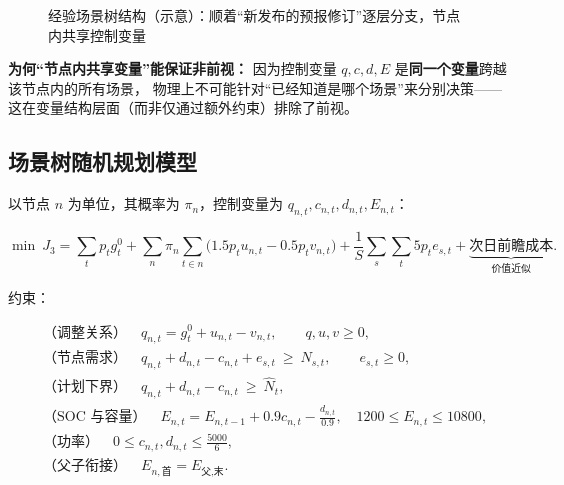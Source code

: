 \begin{figure}[H]
\centering
{}
\caption{经验场景树结构（示意）：顺着“新发布的预报修订”逐层分支，节点内共享控制变量}
\label{fig:q3-tree}
\end{figure}

\vspace{0.2em}
\noindent\textbf{为何“节点内共享变量”能保证非前视：}
因为控制变量 $q,c,d,E$ 是\textbf{同一个变量}跨越该节点内的所有场景，
物理上不可能针对“已经知道是哪个场景”来分别决策——
这在变量结构层面（而非仅通过额外约束）排除了前视。

\subsection{场景树随机规划模型}

以节点 $n$ 为单位，其概率为 $\pi_n$，控制变量为 $q_{n,t},c_{n,t},d_{n,t},E_{n,t}$：

\begin{equation}
\min\ J_3=\sum_tp_tg_t^0
+\sum_n\pi_n\sum_{t\in n}\bigl(1.5p_tu_{n,t}-0.5p_tv_{n,t}\bigr)
+\frac{1}{S}\sum_s\sum_t5p_te_{s,t}
+\underbrace{\text{次日前瞻成本}}_{\text{价值近似}}.
\label{eq:q3-obj}
\end{equation}

约束：

\begin{align}
&\text{（调整关系）}\quad q_{n,t}=g_t^0+u_{n,t}-v_{n,t},\qquad q,u,v\ge 0, \label{eq:q3-adj}\\
&\text{（节点需求）}\quad q_{n,t}+d_{n,t}-c_{n,t}+e_{s,t}\ \ge\ N_{s,t},\qquad e_{s,t}\ge0, \label{eq:q3-dem}\\
&\text{（计划下界）}\quad q_{n,t}+d_{n,t}-c_{n,t}\ \ge\ \hat N_t, \label{eq:q3-floor}\\
&\text{（SOC 与容量）}\quad E_{n,t}=E_{n,t-1}+0.9c_{n,t}-\frac{d_{n,t}}{0.9},\quad
   1200\le E_{n,t}\le10800, \label{eq:q3-soc}\\
&\text{（功率）}\quad 0\le c_{n,t},d_{n,t}\le\frac{5000}{6}, \label{eq:q3-pow}\\
&\text{（父子衔接）}\quad E_{n,\text{首}}=E_{\text{父},\text{末}}. \label{eq:q3-link}
\end{align}


